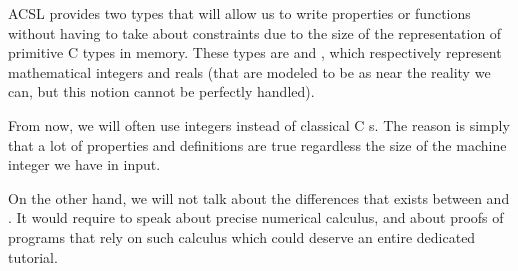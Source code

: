ACSL provides two types that will allow us to write properties or
functions without having to take about constraints due to the size of
the representation of primitive C types in memory. These types are
 and , which respectively represent
mathematical integers and reals (that are modeled to be as near the
reality we can, but this notion cannot be perfectly handled).

From now, we will often use integers instead of classical C
s. The reason is simply that a lot of properties and
definitions are true regardless the size of the machine integer we have
in input.

On the other hand, we will not talk about the differences that exists
between  and . It would require to
speak about precise numerical calculus, and about proofs of programs
that rely on such calculus which could deserve an entire dedicated
tutorial.
